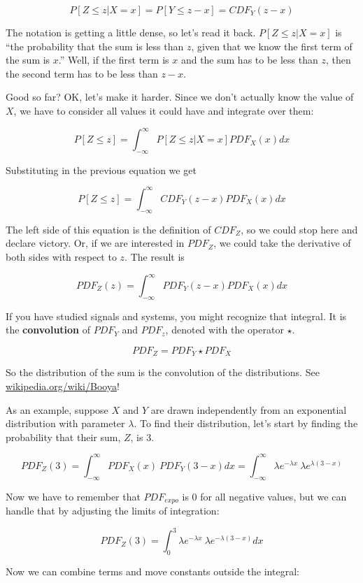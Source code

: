 \documentclass[12pt]{book}
\begin{document}
\[ P[Z \le z | X = x] = P[Y \le z-x] = CDF_Y(z-x) \]

The notation is getting a little dense, so let's read it back.  
$P[Z \le z | X = x]$ is ``the probability that the sum is less than
$z$, given that we know the first term of the sum is $x$.''  Well, if
the first term is $x$ and the sum has to be less than $z$, then the
second term has to be less than $z-x$.

Good so far?  OK, let's make it harder.  Since we don't actually know
the value of $X$, we have to consider all values it could have and
integrate over them:

\newcommand{\infint}{\int_{-\infty}^{\infty}}

\[ P[Z \le z] = \infint P[Z \le z | X = x] PDF_X(x) dx \]

Substituting in the previous equation we get

\[ P[Z \le z] = \infint CDF_Y(z-x) PDF_X(x) dx \]

The left side of this equation is the definition of
$CDF_Z$, so we could stop here and declare victory.  Or, if
we are interested in $PDF_Z$, we could take the derivative of
both sides with respect to $z$.  The result is

\[ PDF_Z(z) = \infint PDF_Y(z-x) PDF_X(x) dx  \]

\newcommand{\convolution}{\star}

If you have studied signals and systems, you might recognize that
integral.  It is the {\bf convolution} of $PDF_Y$ and $PDF_z$, denoted
with the operator $\convolution$.

\[ PDF_Z = PDF_Y \convolution PDF_X \]

So the distribution of the sum is the convolution of the distributions.
See \url{wikipedia.org/wiki/Booya}!

As an example, suppose $X$ and $Y$ are drawn independently from an
exponential distribution with parameter $\lambda$.  To find their
distribution, let's start by finding the probability that their
sum, $Z$, is 3.

\[ PDF_Z(3) = \infint PDF_X(x)~PDF_Y(3-x) dx = 
\infint \lambda e^{-\lambda x}~\lambda e^{\lambda (3-x)} \]

Now we have to remember that $PDF_{expo}$ is 0 for all negative
values, but we can handle that by adjusting the limits of integration:

\[ PDF_Z(3) = \int_{0}^{3} \lambda e^{-\lambda x}~\lambda e^{-\lambda (3-x)} dx \]

Now we can combine terms and move constants outside the integral:
\end{document}
